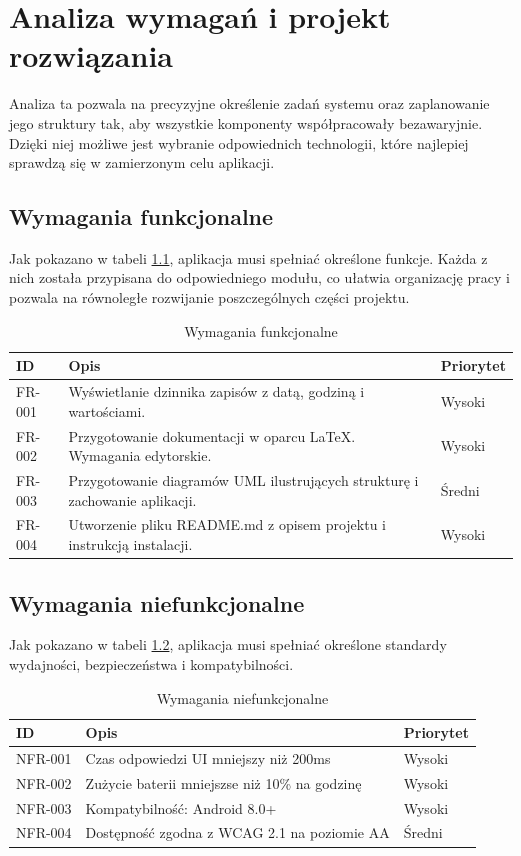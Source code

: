 \chapter{Analiza wymagań i projekt rozwiązania}
Analiza ta pozwala na precyzyjne określenie zadań systemu oraz zaplanowanie jego struktury tak, aby wszystkie komponenty współpracowały bezawaryjnie. Dzięki niej możliwe jest wybranie odpowiednich technologii, które najlepiej sprawdzą się w zamierzonym celu aplikacji.

\section{Wymagania funkcjonalne}
Jak pokazano w tabeli \ref{tab:funkcjonalne}, aplikacja musi spełniać określone funkcje. Każda z nich została przypisana do odpowiedniego modułu, co ułatwia organizację pracy i pozwala na równoległe rozwijanie poszczególnych części projektu.
\begin{table}[ht!]
\centering
\caption{Wymagania funkcjonalne}
\label{tab:funkcjonalne}
\begin{tabular}{lll}
\toprule
ID & Opis & Priorytet \\  
\midrule
FR-001      & Wyświetlanie dzinnika zapisów z datą, godziną i wartościami.    & Wysoki \\
FR-002      & Przygotowanie dokumentacji w oparcu LaTeX. Wymagania edytorskie.    & Wysoki \\
FR-003      & Przygotowanie diagramów UML ilustrujących strukturę i zachowanie aplikacji.    & Średni \\
FR-004      & Utworzenie pliku README.md z opisem projektu i instrukcją instalacji.    & Wysoki \\
\bottomrule 
\end{tabular}
\end{table}

\section{Wymagania niefunkcjonalne}
Jak pokazano w tabeli \ref{tab:niefunkcjonalne}, aplikacja musi spełniać określone standardy wydajności, bezpieczeństwa i kompatybilności.
\begin{table}[ht!]
\centering
\caption{Wymagania niefunkcjonalne}
\label{tab:niefunkcjonalne}
\begin{tabular}{lll}
\toprule
ID & Opis & Priorytet \\  
\midrule
NFR-001      & Czas odpowiedzi UI mniejszy niż 200ms    & Wysoki \\
NFR-002      & Zużycie baterii mniejszse niż 10\% na godzinę    & Wysoki \\
NFR-003      & Kompatybilność: Android 8.0+	    & Wysoki \\
NFR-004      & Dostępność zgodna z WCAG 2.1 na poziomie AA    & Średni \\
\bottomrule 
\end{tabular}
\end{table}

